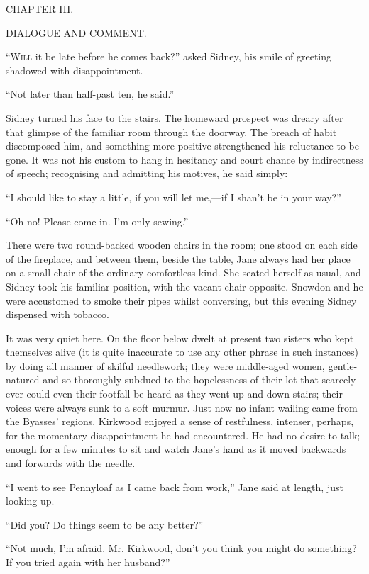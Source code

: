 {}

{CHAPTER III.}

DIALOGUE AND COMMENT.

\textsc{``Will} it be late before he comes back?'' asked Sidney, his
smile of greeting shadowed with disappointment.

``Not later than half-past ten, he said.''

Sidney turned his face to the stairs. The homeward prospect was dreary
after that glimpse of the familiar room through the doorway. The breach
of habit discomposed him, and something more positive strengthened his
reluctance to be gone. It was not his custom to hang in hesitancy and
court chance by indirectness of speech; recognising and admitting his
motives, he said simply:

``I should like to stay a little, if you will let me,---if I shan't be
in your way?''

{}``Oh no! Please come in. I'm only sewing.''

There were two round-backed wooden chairs in the room; one stood on each
side of the fireplace, and between them, beside the table, Jane always
had her place on a small chair of the ordinary comfortless kind. She
seated herself as usual, and Sidney took his familiar position, with the
vacant chair opposite. Snowdon and he were accustomed to smoke their
pipes whilst conversing, but this evening Sidney dispensed with tobacco.

It was very quiet here. On the floor below dwelt at present two sisters
who kept themselves alive (it is quite inaccurate to use any other
phrase in such instances) by doing all manner of skilful needlework;
they were middle-aged women, gentle-natured and so thoroughly subdued to
the hopelessness of their lot that scarcely ever could even their
footfall be heard as they went up and down stairs; their voices were
always sunk to a soft murmur. Just now no infant wailing came from the
Byasses' regions. Kirkwood {}enjoyed a sense of restfulness, intenser,
perhaps, for the momentary disappointment he had encountered. He had no
desire to talk; enough for a few minutes to sit and watch Jane's hand as
it moved backwards and forwards with the needle.

``I went to see Pennyloaf as I came back from work,'' Jane said at
length, just looking up.

``Did you? Do things seem to be any better?''

``Not much, I'm afraid. Mr. Kirkwood, don't you think you might do
something? If you tried again with her husband?''

